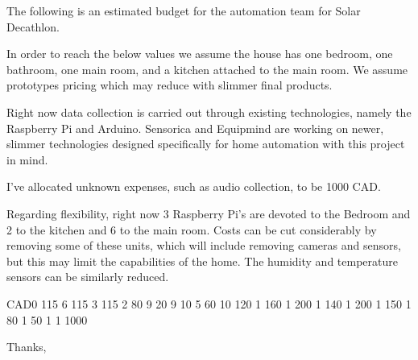 

\address{}
\signature{Calem J Bendell}
\date{\today}


	
  \begin{letter}{}
    
    The following is an estimated budget for the automation team for Solar Decathlon.
    
    In order to reach the below values we assume the house has one bedroom, one bathroom, one main room, and a kitchen attached to the main room.
    We assume prototypes pricing which may reduce with slimmer final products.
    
    Right now data collection is carried out through existing technologies, namely the Raspberry Pi and Arduino.
    Sensorica and Equipmind are working on newer, slimmer technologies designed specifically for home automation with this project in mind.
    
    I've allocated unknown expenses, such as audio collection, to be 1000 CAD.
    
    Regarding flexibility, right now 3 Raspberry Pi's are devoted to the Bedroom and 2 to the kitchen and 6 to the main room.
    Costs can be cut considerably by removing some of these units, which will include removing cameras and sensors, but this may limit the capabilities of the home.
    The humidity and temperature sensors can be similarly reduced.
    
    \begin{invoice}{CAD}{0}
       {115} {6}
       {115} {3}
       {115} {2}
       {80} {9}
       {20} {9}
       {10} {5}
       {60} {10}
       {120} {1}
       {160} {1}
       {200} {1}
       {140} {1}
       {200} {1}
       {150} {1}
       {80} {1}
       {50} {1}
       {1} {1000}
    \end{invoice}
    
    \closing{Thanks,}
  \end{letter}

